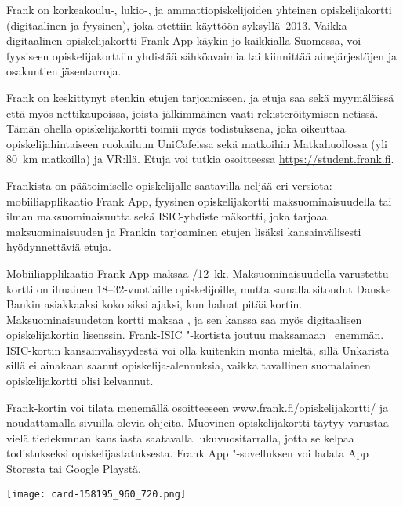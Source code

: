 \documentclass[../ala_hataile.tex]{subfiles}
\begin{document}
Frank on korkeakoulu-, lukio-, ja ammattiopiskelijoiden
yhteinen opiskelijakortti (digitaalinen ja fyysinen),
joka otettiin käyttöön syksyllä~2013. Vaikka digitaalinen opiskelijakortti Frank App käykin jo kaikkialla Suomessa, voi fyysiseen opiskelijakorttiin yhdistää sähköavaimia tai kiinnittää ainejärjestöjen ja osakuntien jäsentarroja.

Frank on keskittynyt etenkin etujen tarjoamiseen,
ja etuja saa sekä myymälöissä
että myös nettikaupoissa, joista jälkimmäinen
vaati rekisteröitymisen netissä. Tämän
ohella opiskelijakortti toimii myös todistuksena, joka oikeuttaa opiskelijahintaiseen
ruokailuun UniCafeissa sekä
matkoihin Matkahuollossa (yli 80~km
matkoilla) ja VR:llä. Etuja voi tutkia
osoitteessa \url{https://student.frank.fi}.

Frankista on päätoimiselle
opiskelijalle saatavilla neljää eri
versiota: mobiili\-applikaatio Frank App, fyysinen opiskelijakortti maksu\-ominaisuudella tai ilman maksu\-ominaisuutta sekä
ISIC-yhdistelmä\-kortti,
joka tarjoaa maksuominaisuuden
ja Frankin tarjoaminen
etujen lisäksi
kansainvälisesti hyödynnettäviä
etuja.

Mobiiliapplikaatio Frank App maksaa /12~kk. Maksuominaisuudella varustettu kortti on ilmainen 18--32-vuotiaille opiskelijoille, mutta samalla sitoudut Danske Bankin asiakkaaksi koko siksi ajaksi, kun haluat pitää kortin. Maksuominaisuudeton kortti maksaa , ja sen kanssa saa myös digitaalisen opiskelijakortin lisenssin. Frank-ISIC "-kortista joutuu
maksamaan~ enemmän. ISIC-kortin kansainvälisyydestä voi olla kuitenkin monta mieltä, sillä Unkarista sillä ei ainakaan saanut opiskelija-alennuksia, vaikka tavallinen suomalainen opiskelijakortti olisi kelvannut.

Frank-kortin voi tilata menemällä osoitteeseen
\url{www.frank.fi/opiskelijakortti/} ja noudattamalla sivuilla olevia ohjeita. Muovinen opiskelijakortti täytyy varustaa vielä tiedekunnan kansliasta saatavalla lukuvuositarralla, jotta se kelpaa todistukseksi opiskelijastatuksesta. Frank App "-sovelluksen voi ladata App Storesta tai Google Playstä. 

\texttt{[image: card-158195\_960\_720.png]}
\end{document}
